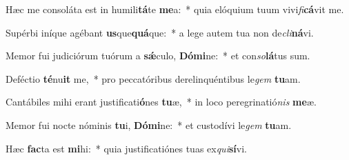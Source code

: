 \item Hæc me consoláta est in humili\textbf{tá}te \textbf{me}a:~* quia elóquium tuum vivi\textit{fi}\textbf{cá}vit me.
\item Supérbi iníque agébant \textbf{us}que\textbf{quá}que:~* a lege autem tua non de\textit{cli}\textbf{ná}vi.
\item Memor fui judiciórum tuórum a \textbf{sǽ}culo, \textbf{Dó}\textbf{mi}ne:~* et con\textit{so}\textbf{lá}tus sum.
\item Deféctio \textbf{té}nu\textbf{it} me,~* pro peccatóribus derelinquéntibus le\textit{gem} \textbf{tu}am.
\item Cantábiles mihi erant justificati\textbf{ó}nes \textbf{tu}æ,~* in loco peregrinatió\textit{nis} \textbf{me}æ.
\item Memor fui nocte nóminis \textbf{tu}i, \textbf{Dó}\textbf{mi}ne:~* et custodívi le\textit{gem} \textbf{tu}am.
\item Hæc \textbf{fac}ta est \textbf{mi}hi:~* quia justificatiónes tuas ex\textit{qui}\textbf{sí}vi.
